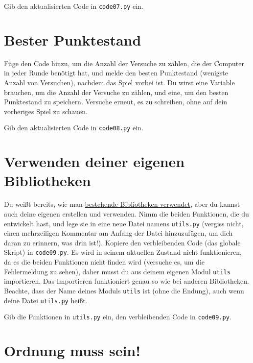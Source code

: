 \documentclass[
]{book}
\begin{document}
Gib den aktualisierten Code in \texttt{code07.py} ein.

\hypertarget{bester-punktestand}{%
\section{Bester Punktestand}\label{bester-punktestand}}

Füge den Code hinzu, um die Anzahl der Versuche zu zählen, die der Computer in jeder Runde benötigt hat, und melde den besten Punktestand (wenigste Anzahl von Versuchen), nachdem das Spiel vorbei ist. Du wirst eine Variable brauchen, um die Anzahl der Versuche zu zählen, und eine, um den besten Punktestand zu speichern. Versuche erneut, es zu schreiben, ohne auf dein vorheriges Spiel zu schauen.

Gib den aktualisierten Code in \texttt{code08.py} ein.

\hypertarget{verwenden-deiner-eigenen-bibliotheken}{%
\section{Verwenden deiner eigenen Bibliotheken}\label{verwenden-deiner-eigenen-bibliotheken}}

Du weißt bereits, wie man \protect\hyperlink{using-libraries}{bestehende Bibliotheken verwendet}, aber du kannst auch deine eigenen erstellen und verwenden. Nimm die beiden Funktionen, die du entwickelt hast, und lege sie in eine neue Datei namens \texttt{utils.py} (vergiss nicht, einen mehrzeiligen Kommentar am Anfang der Datei hinzuzufügen, um dich daran zu erinnern, was drin ist!). Kopiere den verbleibenden Code (das globale Skript) in \texttt{code09.py}. Es wird in seinem aktuellen Zustand nicht funktionieren, da es die beiden Funktionen nicht finden wird (versuche es, um die Fehlermeldung zu sehen), daher musst du aus deinem eigenen Modul \texttt{utils} importieren. Das Importieren funktioniert genau so wie bei anderen Bibliotheken. Beachte, dass der Name deines Moduls \texttt{utils} ist (ohne die Endung), auch wenn deine Datei \texttt{utils.py} heißt.

Gib die Funktionen in \texttt{utils.py} ein, den verbleibenden Code in \texttt{code09.py}.

\hypertarget{keep-imports-tidy}{%
\section{Ordnung muss sein!}\label{keep-imports-tidy}}
\end{document}
